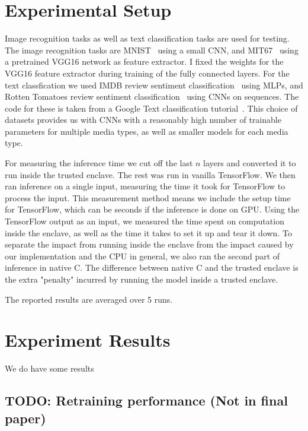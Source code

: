 \documentclass[11pt]{article}
\newcommand{\tf}{TensorFlow}
\begin{document}
\section{Experimental Setup}
\label{sec:setup}

Image recognition tasks as well as text classification tasks are used for testing.
The image recognition tasks are MNIST~\cite{noauthor_mnist_nodate} using a small CNN, and MIT67~\cite{quattoni_recognizing_nodate} using a pretrained VGG16 network as feature extractor.
I fixed the weights for the VGG16 feature extractor during training of the fully connected layers.
For the text classfication we used IMDB review sentiment classification~\cite{maas_learning_2011} using MLPs, and Rotten Tomatoes review sentiment classification~\cite{noauthor_sentiment_nodate} using CNNs on sequences.
The code for these is taken from a Google Text classification tutorial~\cite{noauthor_googleeng-edu_nodate}.
This choice of datasets provides us with CNNs with a reasonably high number of trainable parameters for multiple media types, as well as smaller models for each media type.

For measuring the inference time we cut off the last $n$ layers and converted it to run inside the trusted enclave.
The rest was run in vanilla \tf{}.
We then ran inference on a single input, measuring the time it took for \tf{} to process the input.
This measurement method means we include the setup time for \tf{}, which can be seconds if the inference is done on GPU.
Using the \tf{} output as an input, we measured the time spent on computation inside the enclave, as well as the time it takes to set it up and tear it down.
To separate the impact from running inside the enclave from the impact caused by our implementation and the CPU in general, we also ran the second part of inference in native C.
The difference between native C and the trusted enclave is the extra "penalty" incurred by running the model inside a trusted enclave.

The reported results are averaged over 5 runs.

\section{Experiment Results}
\label{sec:results}

We do have some results

\subsection{TODO: Retraining performance (Not in final paper)}
\end{document}
